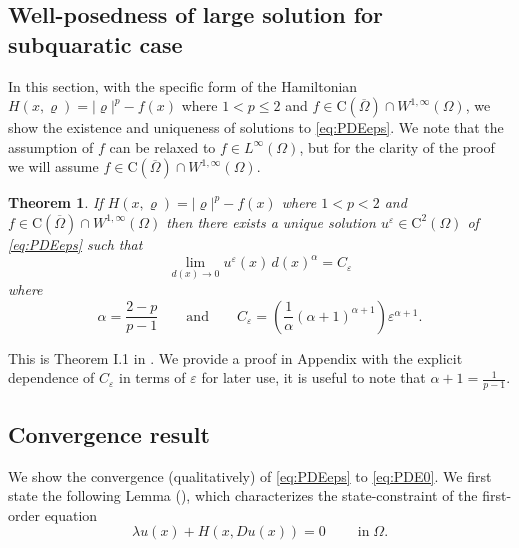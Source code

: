 \documentclass[11pt,reqno]{amsart}
\numberwithin{figure}{section}
\theoremstyle{plain}
\newtheorem{thm}{Theorem}[section]
\theoremstyle{remark}
\numberwithin{equation}{section}
\begin{document}
\subsection{Well-posedness of large solution for subquaratic case} In this section, with the specific form of the Hamiltonian $H(x,\varrho) = |\varrho|^p - f(x)$ where $1<p\leq 2$ and $f\in \mathrm{C}(\overline{\Omega})\cap W^{1,\infty}(\Omega)$, we show the existence and uniqueness of solutions to \eqref{eq:PDEeps}. 
We note that the assumption of $f$ can be relaxed to $f\in L^\infty(\Omega)$, but for the clarity of the proof we will assume $f\in \mathrm{C}(\overline{\Omega})\cap W^{1,\infty}(\Omega)$.

\begin{thm}\label{thm:wellposed1<p<2} If $H(x,\varrho) = |\varrho|^p - f(x)$ where $1<p< 2$ and $f\in \mathrm{C}(\overline{\Omega})\cap W^{1,\infty}(\Omega)$ then there exists a unique solution $u^\varepsilon\in \mathrm{C}^2(\Omega)$ of \eqref{eq:PDEeps} such that
\begin{equation*}
    \lim_{d(x)\to 0} u^\varepsilon(x) \,d(x)^\alpha = C_\varepsilon 
\end{equation*}
where
\begin{equation*}
    \displaystyle\alpha = \frac{2-p}{p-1} \qquad\text{and}\qquad C_\varepsilon = \left(\frac{1}{\alpha}(\alpha+1)^{\alpha+1}\right) \varepsilon^{\alpha+1}.
\end{equation*}
\end{thm}
\noindent This is Theorem I.1 in \cite{Lasry1989}. We provide a proof in Appendix with the explicit dependence of $C_\varepsilon$ in terms of $\varepsilon$ for later use, it is useful to note that $\alpha+1 = \frac{1}{p-1}$.

\subsection{Convergence result} We show the convergence (qualitatively) of \eqref{eq:PDEeps} to \eqref{eq:PDE0}. We first state the following Lemma (\cite{Capuzzo-Dolcetta1990}), which characterizes the state-constraint of the first-order equation
\begin{equation}\label{S_0}
 \lambda u(x) + H(x,Du(x)) = 0\;\qquad\text{in}\;\Omega. \tag{$S_0$}
\end{equation}
\end{document}
